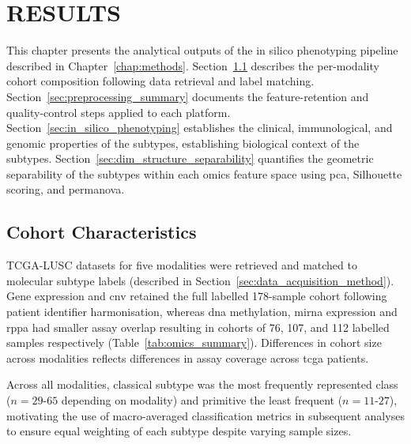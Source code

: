 \chapter{RESULTS}


This chapter presents the analytical outputs of the in silico phenotyping pipeline described in Chapter~\ref{chap:methods}. Section~\ref{sec:cohort_characteristics} describes the per-modality cohort composition following data retrieval and label matching.
Section~\ref{sec:preprocessing_summary} documents the feature-retention and quality-control
steps applied to each platform. Section~\ref{sec:in_silico_phenotyping} establishes
the clinical, immunological, and genomic properties of the subtypes, establishing biological context of the subtypes. Section~\ref{sec:dim_structure_separability} quantifies the geometric separability of the subtypes within each omics feature space using \gls{pca}, Silhouette scoring, and \gls{permanova}.




\section{Cohort Characteristics}
\label{sec:cohort_characteristics}


TCGA-LUSC datasets for five modalities were retrieved and matched to molecular subtype labels (described in Section~\ref{sec:data_acquisition_method}). Gene expression and \gls{cnv} retained the full labelled 178-sample cohort following patient identifier harmonisation, whereas \gls{dna} methylation, \gls{mirna} expression and \gls{rppa} had smaller assay overlap resulting in cohorts of 76, 107, and 112 labelled samples respectively (Table~\ref{tab:omics_summary}). Differences in cohort size across modalities reflects differences in assay coverage across
\gls{tcga} patients.

Across all modalities, classical subtype was the most frequently represented class ($n = 29$-$65$ depending on modality) and primitive the least frequent ($n = 11$-$27$), motivating the use of macro-averaged classification metrics in subsequent analyses to ensure equal weighting of each subtype despite varying sample sizes.

